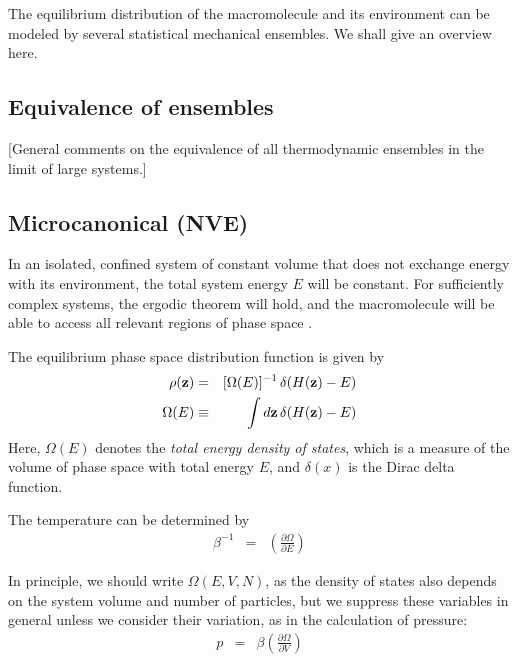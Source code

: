 The equilibrium distribution of the macromolecule and its environment can be modeled by several statistical mechanical ensembles.
We shall give an overview here.

\subsection{Equivalence of ensembles}
\label{section:equivalence-of-ensembles}

[General comments on the equivalence of all thermodynamic ensembles in the limit of large systems.]

\subsection{Microcanonical (NVE)} 
\label{section:nve}
 

In an isolated, confined system of constant volume that does not exchange energy with its environment, the total system energy $E$ will be constant.
For sufficiently complex systems, the ergodic theorem will hold, and the macromolecule will be able to access all relevant regions of phase space \cite{kinchin:statmech:1949}.

The equilibrium phase space distribution function is given by
\begin{eqnarray}
\rho({\bf z}) &=& [\Omega(E)]^{-1} \, \delta(H({\bf z}) - E) \nonumber \\
\Omega(E) &\equiv& \int d{\bf z} \, \delta(H({\bf z}) - E)
\end{eqnarray}
Here, $\Omega(E)$ denotes the \emph{total energy density of states}, which is a measure of the volume of phase space with total energy $E$, and $\delta(x)$ is the Dirac delta function.  \label{notation:total-energy-density-of-states}

The temperature can be determined by
\begin{eqnarray}
\beta^{-1} &=& \left( \frac{\partial \Omega}{\partial E} \right) 
\end{eqnarray}

In principle, we should write $\Omega(E,V,N)$, as the density of states also depends on the system volume and number of particles, but we suppress these variables in general unless we consider their variation, as in the calculation of pressure:
\begin{eqnarray}
p &=& \beta \left( \frac{\partial \Omega}{\partial V} \right)
\end{eqnarray}

